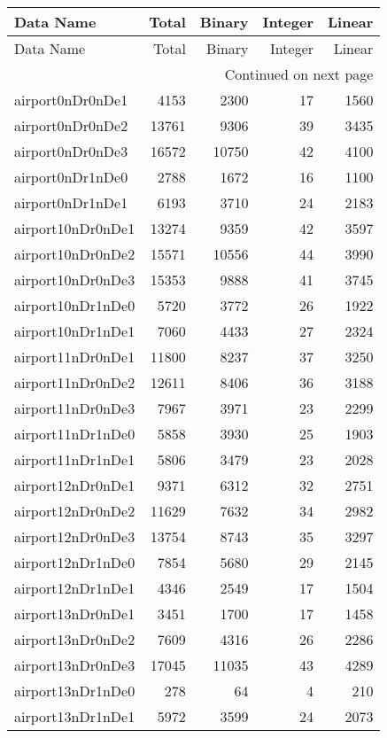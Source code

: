 \begin{longtable}{lrrrr}
\toprule
Data Name & Total & Binary & Integer & Linear \\
\midrule
\endfirsthead
\toprule
Data Name & Total & Binary & Integer & Linear \\
\midrule
\endhead
\midrule
\multicolumn{5}{r}{Continued on next page} \\
\midrule
\endfoot
\bottomrule
\endlastfoot
airport0nDr0nDe1 & 4153 & 2300 & 17 & 1560 \\
airport0nDr0nDe2 & 13761 & 9306 & 39 & 3435 \\
airport0nDr0nDe3 & 16572 & 10750 & 42 & 4100 \\
airport0nDr1nDe0 & 2788 & 1672 & 16 & 1100 \\
airport0nDr1nDe1 & 6193 & 3710 & 24 & 2183 \\
airport10nDr0nDe1 & 13274 & 9359 & 42 & 3597 \\
airport10nDr0nDe2 & 15571 & 10556 & 44 & 3990 \\
airport10nDr0nDe3 & 15353 & 9888 & 41 & 3745 \\
airport10nDr1nDe0 & 5720 & 3772 & 26 & 1922 \\
airport10nDr1nDe1 & 7060 & 4433 & 27 & 2324 \\
airport11nDr0nDe1 & 11800 & 8237 & 37 & 3250 \\
airport11nDr0nDe2 & 12611 & 8406 & 36 & 3188 \\
airport11nDr0nDe3 & 7967 & 3971 & 23 & 2299 \\
airport11nDr1nDe0 & 5858 & 3930 & 25 & 1903 \\
airport11nDr1nDe1 & 5806 & 3479 & 23 & 2028 \\
airport12nDr0nDe1 & 9371 & 6312 & 32 & 2751 \\
airport12nDr0nDe2 & 11629 & 7632 & 34 & 2982 \\
airport12nDr0nDe3 & 13754 & 8743 & 35 & 3297 \\
airport12nDr1nDe0 & 7854 & 5680 & 29 & 2145 \\
airport12nDr1nDe1 & 4346 & 2549 & 17 & 1504 \\
airport13nDr0nDe1 & 3451 & 1700 & 17 & 1458 \\
airport13nDr0nDe2 & 7609 & 4316 & 26 & 2286 \\
airport13nDr0nDe3 & 17045 & 11035 & 43 & 4289 \\
airport13nDr1nDe0 & 278 & 64 & 4 & 210 \\
airport13nDr1nDe1 & 5972 & 3599 & 24 & 2073 \\

\end{longtable}
